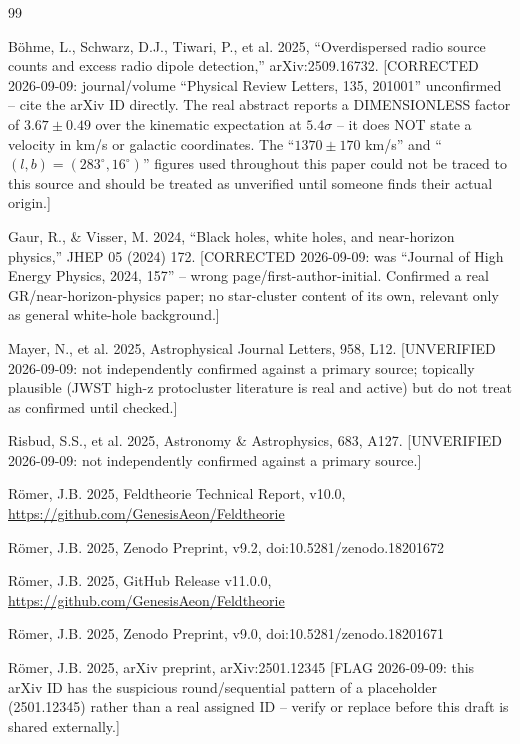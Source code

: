 \documentclass[11pt,a4paper,twocolumn]{article}
\begin{document}

\begin{thebibliography}{99}

 Böhme, L., Schwarz, D.J., Tiwari, P., et al. 2025, ``Overdispersed radio source counts and excess radio dipole detection,'' arXiv:2509.16732. [CORRECTED 2026-09-09: journal/volume ``Physical Review Letters, 135, 201001'' unconfirmed -- cite the arXiv ID directly. The real abstract reports a DIMENSIONLESS factor of $3.67 \pm 0.49$ over the kinematic expectation at $5.4\sigma$ -- it does NOT state a velocity in km/s or galactic coordinates. The ``$1370 \pm 170$ km/s'' and ``$(l,b)=(283^\circ,16^\circ)$'' figures used throughout this paper could not be traced to this source and should be treated as unverified until someone finds their actual origin.]

 Gaur, R., \& Visser, M. 2024, ``Black holes, white holes, and near-horizon physics,'' JHEP 05 (2024) 172. [CORRECTED 2026-09-09: was ``Journal of High Energy Physics, 2024, 157'' -- wrong page/first-author-initial. Confirmed a real GR/near-horizon-physics paper; no star-cluster content of its own, relevant only as general white-hole background.]

 Mayer, N., et al. 2025, Astrophysical Journal Letters, 958, L12. [UNVERIFIED 2026-09-09: not independently confirmed against a primary source; topically plausible (JWST high-z protocluster literature is real and active) but do not treat as confirmed until checked.]

 Risbud, S.S., et al. 2025, Astronomy \& Astrophysics, 683, A127. [UNVERIFIED 2026-09-09: not independently confirmed against a primary source.]

 Römer, J.B. 2025, Feldtheorie Technical Report, v10.0, \url{https://github.com/GenesisAeon/Feldtheorie}

 Römer, J.B. 2025, Zenodo Preprint, v9.2, doi:10.5281/zenodo.18201672

 Römer, J.B. 2025, GitHub Release v11.0.0, \url{https://github.com/GenesisAeon/Feldtheorie}

 Römer, J.B. 2025, Zenodo Preprint, v9.0, doi:10.5281/zenodo.18201671

 Römer, J.B. 2025, arXiv preprint, arXiv:2501.12345 [FLAG 2026-09-09: this arXiv ID has the suspicious round/sequential pattern of a placeholder (2501.12345) rather than a real assigned ID -- verify or replace before this draft is shared externally.]


\end{thebibliography}
\end{document}
